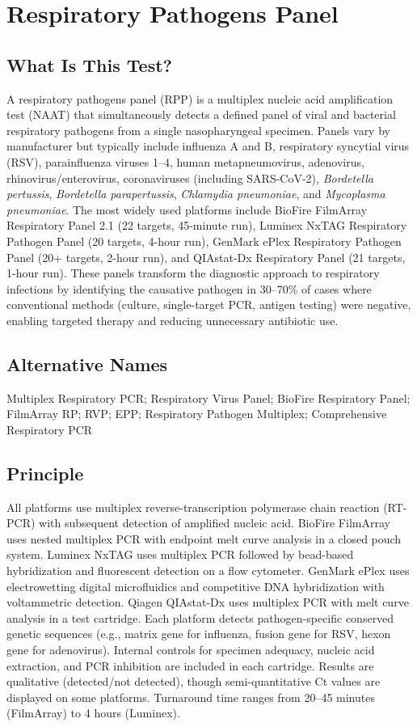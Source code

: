 \chapter{Respiratory Pathogens Panel}

\section*{What Is This Test?}
A respiratory pathogens panel (RPP) is a multiplex nucleic acid amplification test (NAAT) that simultaneously detects a defined panel of viral and bacterial respiratory pathogens from a single nasopharyngeal specimen. Panels vary by manufacturer but typically include influenza A and B, respiratory syncytial virus (RSV), parainfluenza viruses 1--4, human metapneumovirus, adenovirus, rhinovirus/enterovirus, coronaviruses (including SARS-CoV-2), \textit{Bordetella pertussis}, \textit{Bordetella parapertussis}, \textit{Chlamydia pneumoniae}, and \textit{Mycoplasma pneumoniae}. The most widely used platforms include BioFire FilmArray Respiratory Panel 2.1 (22 targets, 45-minute run), Luminex NxTAG Respiratory Pathogen Panel (20 targets, 4-hour run), GenMark ePlex Respiratory Pathogen Panel (20+ targets, 2-hour run), and QIAstat-Dx Respiratory Panel (21 targets, 1-hour run). These panels transform the diagnostic approach to respiratory infections by identifying the causative pathogen in 30--70\% of cases where conventional methods (culture, single-target PCR, antigen testing) were negative, enabling targeted therapy and reducing unnecessary antibiotic use.

\section*{Alternative Names}
Multiplex Respiratory PCR; Respiratory Virus Panel; BioFire Respiratory Panel; FilmArray RP; RVP; EPP; Respiratory Pathogen Multiplex; Comprehensive Respiratory PCR

\section*{Principle}
All platforms use multiplex reverse-transcription polymerase chain reaction (RT-PCR) with subsequent detection of amplified nucleic acid. BioFire FilmArray uses nested multiplex PCR with endpoint melt curve analysis in a closed pouch system. Luminex NxTAG uses multiplex PCR followed by bead-based hybridization and fluorescent detection on a flow cytometer. GenMark ePlex uses electrowetting digital microfluidics and competitive DNA hybridization with voltammetric detection. Qiagen QIAstat-Dx uses multiplex PCR with melt curve analysis in a test cartridge. Each platform detects pathogen-specific conserved genetic sequences (e.g., matrix gene for influenza, fusion gene for RSV, hexon gene for adenovirus). Internal controls for specimen adequacy, nucleic acid extraction, and PCR inhibition are included in each cartridge. Results are qualitative (detected/not detected), though semi-quantitative Ct values are displayed on some platforms. Turnaround time ranges from 20--45 minutes (FilmArray) to 4 hours (Luminex).

